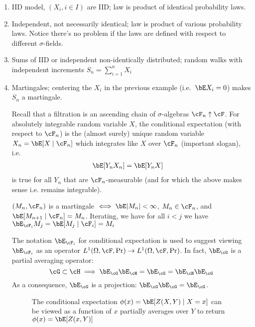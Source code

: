 \begin{enumerate}
  \item IID model, $(X_i, i \in I)$ are IID;
    law is product of identical probability laws.
  \item Independent, not necessarily identical;
    law is product of various probability laws.  Notice there's no problem if
    the laws are defined with respect to different $\sigma$-fields.
  \item Sums of IID or independent non-identically distributed;
    random walks with independent increments $S_n = \sum_{i=1}^n X_i$
  \item Martingales; centering the $X_i$ in the previous example
    (i.e.\ $\bE X_i = 0$) makes $S_n$ a martingale.

    Recall that a filtration is an ascending chain of $\sigma$-algebras
    $\cF_n \uparrow \cF$. For absolutely integrable random variable $X$,
    the conditional expectation (with respect to $\cF_n$) is the
    (almost surely) unique random variable $X_n = \bE[ X \mid \cF_n ]$
    which integrates like $X$ over $\cF_n$ (important slogan), i.e.
    \begin{align*}
      \bE[Y_n X_n ] &= \bE [ Y_n X ]
    \end{align*}
    is true for all $Y_n$ that are $\cF_n$-measurable (and for which the above
    makes sense i.e.  remains integrable).

    $(M_n, \cF_n)$ is a martingale $\iff \bE \lvert M_n \rvert < \infty$,
    $M_n \in \cF_n$, and $\bE[M_{n+1} \mid \cF_n] = M_n$. Iterating, we
    have for all $i < j$ we have $\bE_{\cF_i} M_j = \bE[M_j \mid \cF_i] = M_i$

    The notation $\bE_{\cF_i}$ for conditional expectation
    is used to suggest viewing $\bE_{\cF_i}$ as an operator
    $L^1(\Omega, \cF, \Pr) \to L^1(\Omega, \cF, \Pr)$.
    In fact, $\bE_{\cG}$ is a partial averaging operator:
    \[
      \cG \subset \cH \implies \bE_\cG \bE_\cH = \bE_{\cG} = \bE_{\cH} \bE_\cG
    \]
    As a consequence, $\bE_{\cG}$ is a projection:
    $\bE_{\cG} \bE_{\cG} = \bE_{\cG}$.

    \begin{figure}[ht]
      \begin{center}
      \end{center}
      \caption{The conditional expectation $\phi(x) = \bE[Z(X,Y) \mid X=x]$ can
        be viewed as a function of $x$ partially averages over $Y$ to return
        $\phi(x) = \bE[Z(x, Y)]$}
      \label{fig:1-21-3}
    \end{figure}


\end{enumerate}
